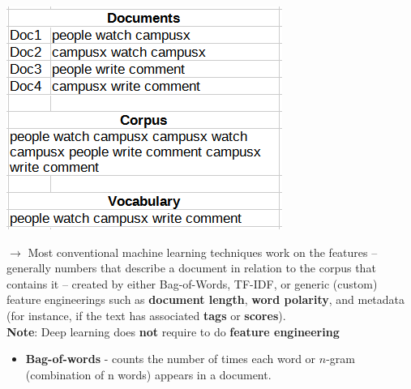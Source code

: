 \documentclass[letterpaper, 10.5pt,landscape]{article}
\begin{document}
\begin{multicols*}{3}
\vspace{-7pt}
\begin{center}
    \begin{minipage}{0.5\linewidth}
    \includegraphics[width=\textwidth]{figures/nlp_corpus_document_vocabulary.png}
    \end{minipage}
\end{center}
\vspace{-7pt}




$\rightarrow$ Most conventional machine learning techniques work on the features – generally numbers that describe a document in relation to the corpus that contains it – created by either Bag-of-Words, TF-IDF, or generic (custom) feature engineerings such as \textbf{document length}, \textbf{word polarity}, and metadata (for instance, if the text has associated \textbf{tags} or \textbf{scores}). \\

\vspace{3pt}
\textbf{Note}: Deep learning does \textbf{not} require to do \textbf{feature engineering} 

\begin{itemize}[label={--},leftmargin=4mm]

\item \textbf{Bag-of-words} - counts the number of times each word or $n$-gram (combination of n words) appears in a document.
\vspace{-3pt}



\end{itemize}
\end{multicols*}
\end{document}
